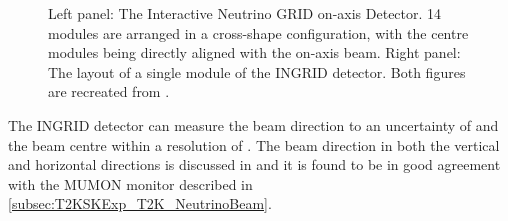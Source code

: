 \begin{figure}[h]
\begin{subfigure}[t]{0.55\textwidth}
  \end{subfigure}%
  \caption{Left panel: The Interactive Neutrino GRID on-axis Detector. 14 modules are arranged in a cross-shape configuration, with the centre modules being directly aligned with the on-axis beam. Right panel: The layout of a single module of the INGRID detector. Both figures are recreated from \cite{t2k_det}.}
  \label{fig:T2KSKExp_T2K_INGRID}
\end{figure}

The INGRID detector can measure the beam direction to an uncertainty of  and the beam centre within a resolution of  \cite{t2k_det}. The beam direction in both the vertical and horizontal directions is discussed in \cite{Suzuki_2015} and it is found to be in good agreement with the MUMON monitor described in \autoref{subsec:T2KSKExp_T2K_NeutrinoBeam}.

